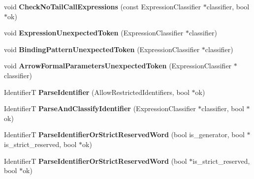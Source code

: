 \begin{DoxyCompactItemize}
\item 
void {\bfseries Check\+No\+Tail\+Call\+Expressions} (const Expression\+Classifier $\ast$classifier, bool $\ast$ok)\hypertarget{classv8_1_1internal_1_1_parser_base_ac0f1d3065b6c96ebce0c1d98b8e78324}{}\label{classv8_1_1internal_1_1_parser_base_ac0f1d3065b6c96ebce0c1d98b8e78324}

\item 
void {\bfseries Expression\+Unexpected\+Token} (Expression\+Classifier $\ast$classifier)\hypertarget{classv8_1_1internal_1_1_parser_base_a6770e81134c86fba190fd48b46896dc9}{}\label{classv8_1_1internal_1_1_parser_base_a6770e81134c86fba190fd48b46896dc9}

\item 
void {\bfseries Binding\+Pattern\+Unexpected\+Token} (Expression\+Classifier $\ast$classifier)\hypertarget{classv8_1_1internal_1_1_parser_base_a3b98f0a250213b8dbb719069a1f0bf48}{}\label{classv8_1_1internal_1_1_parser_base_a3b98f0a250213b8dbb719069a1f0bf48}

\item 
void {\bfseries Arrow\+Formal\+Parameters\+Unexpected\+Token} (Expression\+Classifier $\ast$classifier)\hypertarget{classv8_1_1internal_1_1_parser_base_a09ba8500ec8091eb83530429bd5e9e71}{}\label{classv8_1_1internal_1_1_parser_base_a09ba8500ec8091eb83530429bd5e9e71}

\item 
IdentifierT {\bfseries Parse\+Identifier} (Allow\+Restricted\+Identifiers, bool $\ast$ok)\hypertarget{classv8_1_1internal_1_1_parser_base_a0ee82d37327e4b543e126b44282151c5}{}\label{classv8_1_1internal_1_1_parser_base_a0ee82d37327e4b543e126b44282151c5}

\item 
IdentifierT {\bfseries Parse\+And\+Classify\+Identifier} (Expression\+Classifier $\ast$classifier, bool $\ast$ok)\hypertarget{classv8_1_1internal_1_1_parser_base_a73270b9113c11a50338f804d395a152d}{}\label{classv8_1_1internal_1_1_parser_base_a73270b9113c11a50338f804d395a152d}

\item 
IdentifierT {\bfseries Parse\+Identifier\+Or\+Strict\+Reserved\+Word} (bool is\+\_\+generator, bool $\ast$is\+\_\+strict\+\_\+reserved, bool $\ast$ok)\hypertarget{classv8_1_1internal_1_1_parser_base_a1a97c459b317bd4e64cf18377944bf84}{}\label{classv8_1_1internal_1_1_parser_base_a1a97c459b317bd4e64cf18377944bf84}

\item 
IdentifierT {\bfseries Parse\+Identifier\+Or\+Strict\+Reserved\+Word} (bool $\ast$is\+\_\+strict\+\_\+reserved, bool $\ast$ok)\hypertarget{classv8_1_1internal_1_1_parser_base_a4b25ed23f32468817a0d7d2999230d3e}{}\label{classv8_1_1internal_1_1_parser_base_a4b25ed23f32468817a0d7d2999230d3e}


\end{DoxyCompactItemize}
